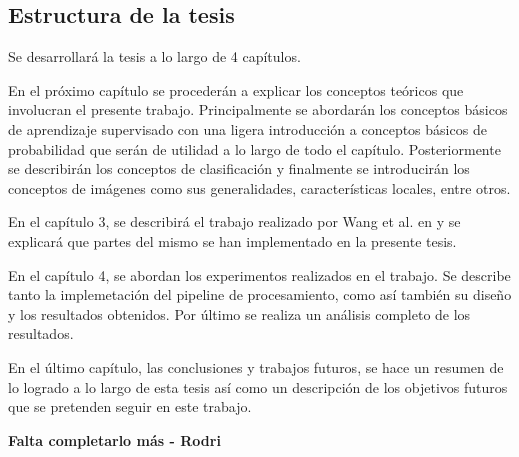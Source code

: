 \subsection{Estructura de la tesis}

	Se desarrollará la tesis a lo largo de 4 capítulos.
	
	En el próximo capítulo se procederán a explicar los conceptos teóricos que involucran el presente trabajo. Principalmente se abordarán los conceptos básicos de aprendizaje supervisado con una ligera introducción a conceptos básicos de probabilidad que serán de utilidad a lo largo de todo el capítulo. Posteriormente se describirán los conceptos de clasificación y finalmente se introducirán los conceptos de imágenes como sus generalidades, características locales, entre otros.
	
	 En el capítulo 3, se describirá el trabajo realizado por Wang et al. en \cite{wang} y se explicará que partes del mismo se han implementado en la presente tesis.

	En el capítulo 4, se abordan los experimentos realizados en el trabajo. Se describe tanto la implemetación del pipeline de procesamiento, como así también su diseño y los resultados obtenidos. Por último se realiza un análisis completo de los resultados.
	
	En el último capítulo, las conclusiones y trabajos futuros, se hace un resumen de lo logrado a lo largo de esta tesis así como un descripción de los objetivos futuros que se pretenden seguir en este trabajo.
	
	\textbf{Falta completarlo más - Rodri}